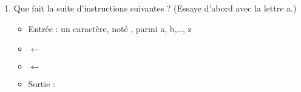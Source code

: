 \documentclass[class=report,crop=false, 12pt]{standalone}
\begin{document}
\begin{activite}
\begin{enumerate}
\begin{enumerate}
    \item  Que fait la suite d'instructions suivantes ? (Essaye d'abord avec la lettre \og{}a\fg{}.)     
    \begin{itemize}
      \item Entrée : un caractère, noté , parmi \og{}a\fg{}, \og{}b\fg{},\ldots, \og{}z\fg{}
      \item {} $\leftarrow$ 
      \item {} $\leftarrow$ 
      \item Sortie : 
    \end{itemize}
    
  \end{enumerate}  
  
\end{enumerate}
\vspace*{-1ex}
\end{activite}
\end{document}
